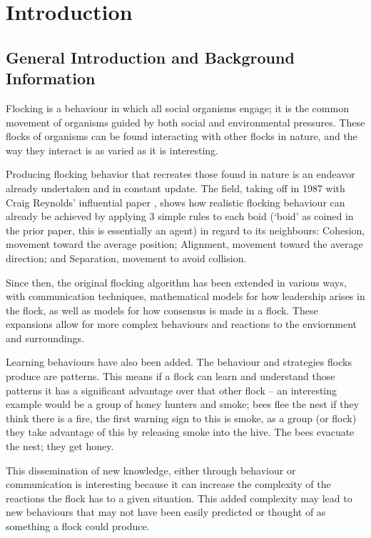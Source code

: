 
\section{Introduction}

\subsection{General Introduction and Background Information} %

Flocking is a behaviour in which all social organisms engage; it is the common movement of organisms guided by both social and environmental pressures. 
These flocks of organisms can be found interacting with other flocks in nature, and the way they interact is as varied as it is interesting.

Producing flocking behavior that recreates those found in nature is an endeavor already undertaken and in constant update. The field, taking off in 1987 with Craig Reynolds’ influential paper \citep{Reynolds:1987:FHS:37402.37406}, shows how realistic flocking behaviour can already be achieved by applying 3 simple rules to each boid (‘boid’ as coined in the prior paper, this is essentially an agent) in regard to its neighbours: Cohesion, movement toward the average position; Alignment, movement toward the average direction; and Separation, movement to avoid collision. 

Since then, the original flocking algorithm has been extended in various ways, with communication techniques, mathematical models for how leadership arises in the flock, as well as models for how consensus is made in a flock. These expansions allow for more complex behaviours and reactions to the enviornment and surroundings.

Learning behaviours have also been added. The behaviour and strategies flocks produce are patterns. This means if a flock can learn and understand those patterns it has a significant advantage over that other flock – an interesting example would be a group of honey hunters and smoke; bees flee the nest if they think there is a fire, the first warning sign to this is smoke, as a group (or flock) they take advantage of this by releasing smoke into the hive. The bees evacuate the nest; they get honey. 

This dissemination of new knowledge, either through behaviour or communication is interesting because it can increase the complexity of the reactions the flock has to a given situation. This added complexity may lead to new behaviours that may not have been easily predicted or thought of as something a flock could produce. 


